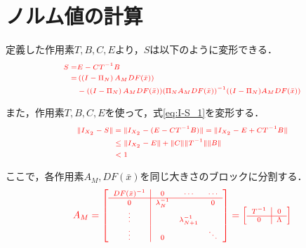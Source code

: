 \documentclass[11pt,a4paper,titlepage]{jsreport}
\theoremstyle{definition}
\providecommand{\DIFdel}[1]{{\protect\color{red} \scriptsize #1}} %
\begin{document}
\section{\DIFdel{ノルム値の計算}}
\addtocounter{section}{-1}%

\DIFdel{定義した作用素$T,B,C,E$より，$S$は以下のように変形できる．
}\begin{displaymath}
  \DIFdel{\begin{split}
    S =& E-CT^{-1}B \\
    =& \left( \left( I-\Pi_N \right) A_M DF ( \bar{x} ) \right)\\
    &- (\left( I-\Pi_N \right) A_M DF( \bar{x} )) (\Pi_N A_M DF(\bar{x}))^{-1} ((I-\Pi_N)A_M DF(\bar{x}))
  \end{split}
}\end{displaymath}%

\DIFdel{また，作用素$T,B,C,E$を使って，式\eqref{eq:I-S_1}を変形する．
}\begin{displaymath}
  \DIFdel{\label{eq:calc_norm}
  \begin{split}
    \|I_{X_2} - S \| &= \| I_{X_2} - (E-CT^{-1}B)  \| = \| I_{X_2} - E + CT^{-1}B \| \\
    & \leq \| I_{X_2} - E \| + \| C \| \| T^{-1} \| \| B \| \\
    & < 1
  \end{split}
}\end{displaymath}%

\DIFdel{ここで，各作用素$A_M,DF(\bar{x})$を同じ大きさのブロックに分割する．
}\begin{displaymath}
  \DIFdel{A_M = \left[
    \begin{array}{c|ccc}
      DF(\bar{x})^{-1} & 0 & \cdots & \cdots \\ \hline
      0 & \lambda_N^{-1} &  & 0 \\
      \vdots &  & \lambda_{N+1}^{-1} &  \\
      \vdots & 0 &   & \ddots
    \end{array}
    \right]
    = \left[ \begin{array}{c|c}
        T^{-1} & 0 \\ \hline
        0 & \Lambda
    \end{array}\right]
}\end{displaymath}%
\end{document}
